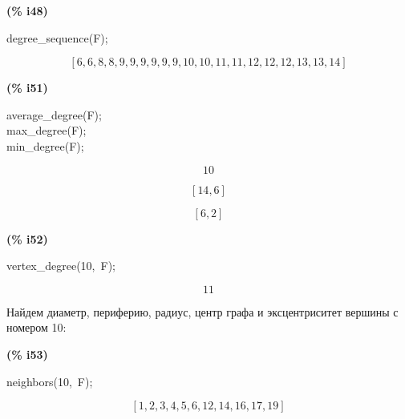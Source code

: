 \documentclass[fleqn]{article}
\begin{document}
\noindent
\begin{minipage}[t]{4.000000em}\color{red}\bfseries
(\% i48)	
\end{minipage}
\begin{minipage}[t]{\textwidth}\color{blue}
degree\_sequence(F);
\end{minipage}
\[\displaystyle \tag{\% o48} 
\left[ 6\operatorname{,}6\operatorname{,}8\operatorname{,}8\operatorname{,}9\operatorname{,}9\operatorname{,}9\operatorname{,}9\operatorname{,}9\operatorname{,}9\operatorname{,}10\operatorname{,}10\operatorname{,}11\operatorname{,}11\operatorname{,}12\operatorname{,}12\operatorname{,}12\operatorname{,}13\operatorname{,}13\operatorname{,}14\right] \mbox{}
\]


\noindent
\begin{minipage}[t]{4.000000em}\color{red}\bfseries
(\% i51)	
\end{minipage}
\begin{minipage}[t]{\textwidth}\color{blue}
average\_degree(F);\\
max\_degree(F);\\
min\_degree(F);
\end{minipage}
\[\displaystyle \tag{\% o49} 
10
\mbox{}\]

\[\tag{\% o50} 
\left[ 14\operatorname{,}6\right] \mbox{}\]

\[\tag{\% o51} 
\left[ 6\operatorname{,}2\right] \mbox{}
\]


\noindent
\begin{minipage}[t]{4.000000em}\color{red}\bfseries
(\% i52)	
\end{minipage}
\begin{minipage}[t]{\textwidth}\color{blue}
vertex\_degree(10,\ F);
\end{minipage}
\[\displaystyle \tag{\% o52} 
11\mbox{}
\]

Найдем диаметр, периферию, радиус, центр графа и эксцентриситет вершины с номером 10:\\
\noindent
\begin{minipage}[t]{4.000000em}\color{red}\bfseries
(\% i53)	
\end{minipage}
\begin{minipage}[t]{\textwidth}\color{blue}
neighbors(10,\ F);
\end{minipage}
\[\displaystyle \tag{\% o53} 
\left[ 1\operatorname{,}2\operatorname{,}3\operatorname{,}4\operatorname{,}5\operatorname{,}6\operatorname{,}12\operatorname{,}14\operatorname{,}16\operatorname{,}17\operatorname{,}19\right] \mbox{}
\]
\end{document}
